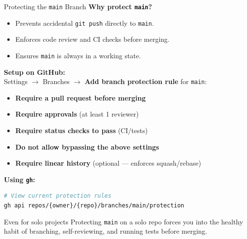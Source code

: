 \documentclass[aspectratio=169, 11pt]{beamer}
\begin{document}
\begin{frame}[fragile]{Protecting the \texttt{main} Branch}
  \textbf{Why protect \texttt{main}?}
  \begin{itemize}
    \item Prevents accidental \texttt{git push} directly to \texttt{main}.
    \item Enforces code review and CI checks before merging.
    \item Ensures \texttt{main} is always in a working state.
  \end{itemize}

  \vspace{0.3em}
  \textbf{Setup on GitHub:}\\
  Settings $\to$ Branches $\to$ \textbf{Add branch protection rule} for \texttt{main}:
  \begin{itemize}
    \item[\checkmark] \textbf{Require a pull request before merging}
    \item[\checkmark] \textbf{Require approvals} (at least 1 reviewer)
    \item[\checkmark] \textbf{Require status checks to pass} (CI/tests)
    \item[\checkmark] \textbf{Do not allow bypassing the above settings}
    \item[$\sim$] \textbf{Require linear history} (optional --- enforces squash/rebase)
  \end{itemize}

  \vspace{0.3em}
  \textbf{Using \texttt{gh}:}
  \begin{lstlisting}[language=bash]
# View current protection rules
gh api repos/{owner}/{repo}/branches/main/protection
  \end{lstlisting}

  \begin{block}{Even for solo projects}
    Protecting \texttt{main} on a solo repo forces you into the healthy habit of branching, self-reviewing, and running tests before merging.
  \end{block}
\end{frame}
\end{document}
